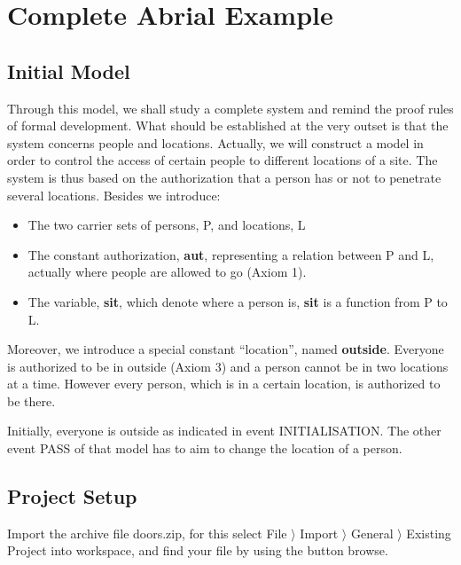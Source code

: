 \section{Complete Abrial Example}
\label{tutorial_10}


\subsection{Initial Model}
Through this model, we shall study a complete system and remind the proof rules of formal development.
What should be established at the very outset is that the system concerns people and locations. Actually, we will construct a model in order to control the access of certain people to different locations of a site.
The system is thus based on the authorization that a person has or not to penetrate several locations.
Besides we introduce:
\begin{itemize}
	\item The two carrier sets of persons, P, and locations, L
	\item The constant authorization, \textbf{aut}, representing a relation between P and L, actually where people are allowed to go (Axiom 1).
	\item The variable, \textbf{sit}, which denote where a person is, \textbf{sit} is a function from P to L.
\end{itemize}  
Moreover, we introduce a special constant “location”, named \textbf{outside}. Everyone is authorized to be in outside (Axiom 3) and a person cannot be in two locations at a time. However every person, which is in a certain location, is authorized to be there.

Initially, everyone is outside as indicated in event \textsf{INITIALISATION}.
The other event \textsf{PASS} of that model has to aim to change the location of a person.

\subsection{Project Setup}
Import the archive file doors.zip, for this select  \textsf{File $\rangle$ Import $\rangle$ General $\rangle$ Existing Project into workspace}, and find your file by using the button browse.

